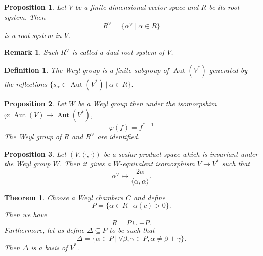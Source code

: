 \documentclass{article}
\newtheorem{theorem}{Theorem}[section]
\newtheorem{proposition}{Proposition}[section]
\newtheorem{definition}{Definition}[section]
\newtheorem{remark}{Remark}[section]
\numberwithin{equation}{section}
\DeclareMathOperator{\Aut}{Aut}
\begin{document}
\begin{proposition}
Let $V$ be a finite dimensional vector space and $R$ be its root system. Then 
\begin{equation*}
R^\lor = \{\alpha^\lor\:|\: \alpha\in R\}
\end{equation*}
is a root system in $V$.
\end{proposition}

\begin{remark}
Such $R^\lor$ is called a dual root system of $V$.
\end{remark}

\begin{definition}
The Weyl group is a finite subgroup of $\Aut(V^*)$ generated by the reflections $\{s_\alpha\in\Aut(V^*)\:|\: \alpha\in R\}$. 
\end{definition}

\begin{proposition}
Let $W$ be a Weyl group then under the isomorpshim $\varphi:\Aut(V)\to\Aut(V^*)$,
\begin{equation*}
\varphi(f) = f^{*,-1}
\end{equation*}
The Weyl group of $R$ and $R^\lor$ are identified. 
\end{proposition}

\begin{proposition}
Let $(V,\langle\cdot,\cdot\rangle)$ be a scalar product space which is invariant under the Weyl group $W$. Then it gives a $W$-equivalent isomorphism $V\to V^*$ such that 
\begin{equation*}
\alpha^\lor\mapsto {\frac {2\alpha} {\langle\alpha,\alpha\rangle}}.
\end{equation*}
\end{proposition}

\begin{theorem}
Choose a Weyl chambers $C$ and define
\begin{equation*}
P = \{\alpha\in R\:|\: \alpha(c)>0\}.
\end{equation*}
Then we have
\begin{equation*}
R=P\cup-P.
\end{equation*}
Furthermore, let us define $\Delta\subseteq P$ to be such that 
\begin{equation*}
\Delta = \{\alpha\in P\:|\: \forall \beta,\gamma\in P, \alpha\not=\beta+\gamma\}.
\end{equation*}
Then $\Delta$ is a basis of $V^*$.
\end{theorem}
\end{document}
